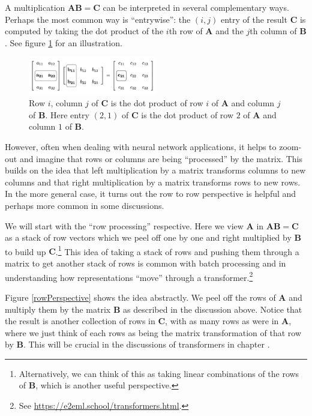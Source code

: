 A multiplication $\mathbf{A}\mathbf{B} = \mathbf{C}$ can be interpreted in several complementary ways. Perhaps the most common way is ``entrywise'': the $(i,j)$ entry of the result $\mathbf{C}$ is computed by taking the dot product of the $i$th row of $\mathbf{A}$ and the $j$th column of $\mathbf{B}$. See figure \ref{entryWiseMatrixProduct} for an illustration. 

\begin{figure}[h]
\centering
\includegraphics[width=0.5\textwidth]{images/matrixProductEntryWise.png}
\caption[Jeff Yoshimi.]{Row $i$, column $j$ of $\mathbf{C}$ is the dot product of row $i$ of $\mathbf{A}$ and column $j$ of $\mathbf{B}$. Here entry $(2,1)$ of $\mathbf{C}$ is the dot product of row $2$ of $\mathbf{A}$ and column $1$ of $\mathbf{B}$.}
\label{entryWiseMatrixProduct}
\end{figure}

However, often when dealing with neural network applications, it helps to zoom-out and imagine that rows or columns are being ``processed'' by the matrix. This builds on the idea that left multiplication by a matrix transforms columns to 
new columns and that right multiplication by a matrix transforms rows to new 
rows. In the more general case, it turns out the row to row perspective is 
helpful and perhaps more common in some discussions. 

We will start with the ``row processing'' respective. Here we view $\mathbf{A}$ in  $\mathbf{A}\mathbf{B} = \mathbf{C}$ as a stack of row vectors which we peel off one by one and right multiplied by $\mathbf{B}$ to build up $\mathbf{C}$.\footnote{Alternatively, we can think of this as taking linear combinations of the rows of $\mathbf{B}$, which is another useful perspective.} This idea of taking a stack of rows and pushing them through a matrix to get another stack of rows is common with batch processing and in understanding how representations ``move'' through a transformer.\footnote{See \url{ https://e2eml.school/transformers.html}.}

Figure \ref{rowPerspective} shows the idea abstractly. We peel off the rows of $\mathbf{A}$ and multiply them by the matrix $\mathbf{B}$ as described in the discussion above. Notice that the result is another collection of rows in $\mathbf{C}$, with as many rows as were in $\mathbf{A}$, where we just think of each rows as being the matrix transformation of that row by $\mathbf{B}$. This will be crucial in the discussions of transformers in chapter . 

